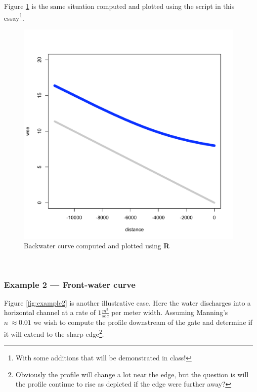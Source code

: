 Figure \ref{fig:Rplot1} is the same situation computed and plotted using the script in this essay\footnote{With some additions that will be demonstrated in class!}.

\begin{figure}[h!] %
   \centering
   \includegraphics[width=5in]{./13-SteadyWSP/example1Rplot.pdf} 
   \caption{Backwater curve computed and plotted using \textbf{R}}
   \label{fig:Rplot1}
\end{figure}

~\newpage
\subsubsection{Example 2 --- Front-water curve}

Figure \ref{fig:example2} is another illustrative case.  Here the water discharges into a horizontal channel at a rate of $1 \frac{m^3}{sec}$ per meter width.  Assuming Manning's $n~\approx 0.01$ we wish to compute the profile downstream of the gate and determine if it will extend  to the sharp edge\footnote{Obviously the profile will change a lot near the edge, but the question is will the profile continue to rise as depicted if the edge were further away?}.

